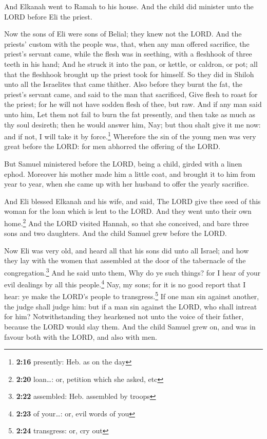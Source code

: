  And Elkanah went to Ramah to his house. And the child
did minister unto the LORD before Eli the priest.

 Now the sons of Eli were sons of Belial; they knew not
the LORD.  And the priests' custom with the people was,
that, when any man offered sacrifice, the priest's servant came, while
the flesh was in seething, with a fleshhook of three teeth in his hand;
 And he struck it into the pan, or kettle, or caldron, or
pot; all that the fleshhook brought up the priest took for himself. So
they did in Shiloh unto all the Israelites that came thither.
 Also before they burnt the fat, the priest's servant
came, and said to the man that sacrificed, Give flesh to roast for the
priest; for he will not have sodden flesh of thee, but raw.
 And if any man said unto him, Let them not fail to burn
the fat presently, and then take as much as thy soul desireth; then he
would answer him, Nay; but thou shalt give it me now: and if not, I will
take it by force.\footnote{\textbf{2:16} presently: Heb. as on the day}
 Wherefore the sin of the young men was very great before
the LORD: for men abhorred the offering of the LORD.

 But Samuel ministered before the LORD, being a child,
girded with a linen ephod.  Moreover his mother made him
a little coat, and brought it to him from year to year, when she came up
with her husband to offer the yearly sacrifice.

 And Eli blessed Elkanah and his wife, and said, The LORD
give thee seed of this woman for the loan which is lent to the LORD. And
they went unto their own home.\footnote{\textbf{2:20} loan\ldots: or,
  petition which she asked, etc}  And the LORD visited
Hannah, so that she conceived, and bare three sons and two daughters.
And the child Samuel grew before the LORD.

 Now Eli was very old, and heard all that his sons did
unto all Israel; and how they lay with the women that assembled at the
door of the tabernacle of the congregation.\footnote{\textbf{2:22}
  assembled: Heb. assembled by troops}  And he said unto
them, Why do ye such things? for I hear of your evil dealings by all
this people.\footnote{\textbf{2:23} of your\ldots: or, evil words of you}
 Nay, my sons; for it is no good report that I hear: ye
make the LORD's people to transgress.\footnote{\textbf{2:24} transgress:
  or, cry out}  If one man sin against another, the judge
shall judge him: but if a man sin against the LORD, who shall intreat
for him? Notwithstanding they hearkened not unto the voice of their
father, because the LORD would slay them.  And the child
Samuel grew on, and was in favour both with the LORD, and also with men.


